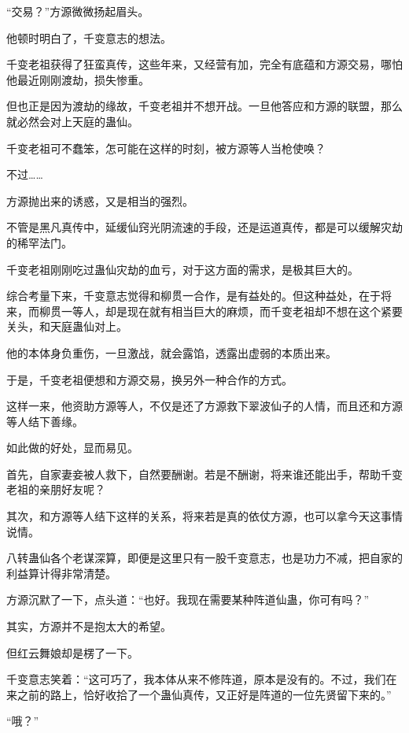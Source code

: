 
\begin{this_body}

“交易？”方源微微扬起眉头。

他顿时明白了，千变意志的想法。

千变老祖获得了狂蛮真传，这些年来，又经营有加，完全有底蕴和方源交易，哪怕他最近刚刚渡劫，损失惨重。

但也正是因为渡劫的缘故，千变老祖并不想开战。一旦他答应和方源的联盟，那么就必然会对上天庭的蛊仙。

千变老祖可不蠢笨，怎可能在这样的时刻，被方源等人当枪使唤？

不过……

方源抛出来的诱惑，又是相当的强烈。

不管是黑凡真传中，延缓仙窍光阴流速的手段，还是运道真传，都是可以缓解灾劫的稀罕法门。

千变老祖刚刚吃过蛊仙灾劫的血亏，对于这方面的需求，是极其巨大的。

综合考量下来，千变意志觉得和柳贯一合作，是有益处的。但这种益处，在于将来，而柳贯一等人，却是现在就有相当巨大的麻烦，而千变老祖却不想在这个紧要关头，和天庭蛊仙对上。

他的本体身负重伤，一旦激战，就会露馅，透露出虚弱的本质出来。

于是，千变老祖便想和方源交易，换另外一种合作的方式。

这样一来，他资助方源等人，不仅是还了方源救下翠波仙子的人情，而且还和方源等人结下善缘。

如此做的好处，显而易见。

首先，自家妻妾被人救下，自然要酬谢。若是不酬谢，将来谁还能出手，帮助千变老祖的亲朋好友呢？

其次，和方源等人结下这样的关系，将来若是真的依仗方源，也可以拿今天这事情说情。

八转蛊仙各个老谋深算，即便是这里只有一股千变意志，也是功力不减，把自家的利益算计得非常清楚。

方源沉默了一下，点头道：“也好。我现在需要某种阵道仙蛊，你可有吗？”

其实，方源并不是抱太大的希望。

但红云舞娘却是楞了一下。

千变意志笑着：“这可巧了，我本体从来不修阵道，原本是没有的。不过，我们在来之前的路上，恰好收拾了一个蛊仙真传，又正好是阵道的一位先贤留下来的。”

“哦？”


\end{this_body}
